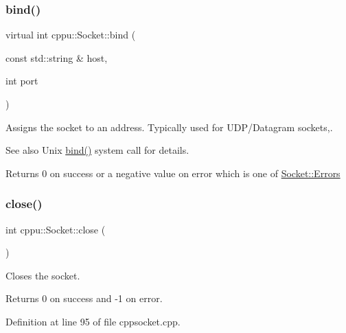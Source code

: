 \subsubsection{\texorpdfstring{bind()}{bind()}\hspace{0.1cm}{\footnotesize\ttfamily [2/2]}}
{\footnotesize\ttfamily virtual int cppu\+::\+Socket\+::bind (\begin{DoxyParamCaption}\item[{const std\+::string \&}]{host,  }\item[{int}]{port }\end{DoxyParamCaption})\hspace{0.3cm}{\ttfamily [virtual]}}



Assigns the socket to an address. Typically used for U\+D\+P/\+Datagram sockets,. 

\begin{DoxySeeAlso}{See also}
Unix \mbox{\hyperlink{classcppu_1_1_socket_a7b876dcaff0babaffde41575f9b19d64}{bind()}} system call for details. 
\end{DoxySeeAlso}
\begin{DoxyReturn}{Returns}
0 on success or a negative value on error which is one of \mbox{\hyperlink{classcppu_1_1_socket_a49ea5cb079bd7ae97ecf7eb30c9d9e5f}{Socket\+::\+Errors}} 
\end{DoxyReturn}
\mbox{\label{classcppu_1_1_socket_ab958ef8a0f0495cf3a1c57a2ad4a34fc}} 
\subsubsection{\texorpdfstring{close()}{close()}}
{\footnotesize\ttfamily int cppu\+::\+Socket\+::close (\begin{DoxyParamCaption}{ }\end{DoxyParamCaption})\hspace{0.3cm}{\ttfamily [virtual]}}



Closes the socket. 

\begin{DoxyReturn}{Returns}
0 on success and -\/1 on error. 
\end{DoxyReturn}


Definition at line 95 of file cppsocket.\+cpp.


